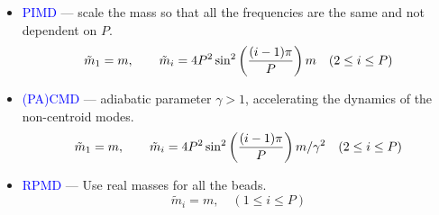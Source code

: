 \begin{frame}
  \begin{itemize}
  \item \textcolor{blue}{{PIMD}} --- scale the mass so that all the frequencies are the
    same and not dependent on $P$.
    \begin{equation*}
      \tilde{m}_1 = m, \qquad \tilde{m}_i = 4P^2\sin^2\left({(i-1)\pi\over
          P}\right) m \quad (2 \le i \le P)
    \end{equation*}
  \item \textcolor{blue}{{(PA)CMD}} --- adiabatic parameter $\gamma > 1$, accelerating the dynamics of the non-centroid modes.
    \begin{equation*}
      \tilde{m}_1 = m, \qquad \tilde{m}_i = 4P^2\sin^2\left({(i-1)\pi\over
          P}\right) m / \gamma^2 \quad (2 \le i \le P)
    \end{equation*}
  \item \textcolor{blue}{{RPMD}} --- Use real masses for all the beads.
    \begin{equation*}
      \tilde{m}_i = m, \quad (1 \le i \le P)
    \end{equation*}
  \end{itemize}
\end{frame}
